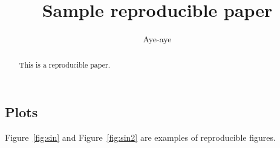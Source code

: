 \author{Aye-aye}
\title{Sample reproducible paper}
\begin{abstract}
  This is a reproducible paper. 
\end{abstract}

\subsection{Plots}
Figure~\ref{fig:sin} and Figure~\ref{fig:sin2} are
examples of reproducible figures.

